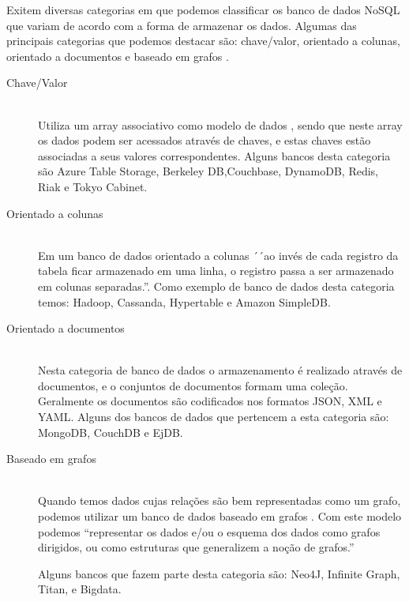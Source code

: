 Exitem diversas categorias\cite{NosqlDatabase} em que podemos classificar os banco de dados NoSQL que variam de acordo com a forma de armazenar os dados. Algumas das  principais categorias que podemos destacar são: chave/valor, orientado a colunas, orientado a documentos e baseado em grafos \cite{AnaliseNosql}.
\begin{description}
\item[Chave/Valor] \hfill \\ 
Utiliza um array associativo como modelo de dados \cite{NosqlWiki}, sendo que neste array os dados podem ser acessados através de chaves, e estas chaves estão associadas a seus valores correspondentes. Alguns bancos desta categoria são Azure Table Storage, Berkeley DB,Couchbase, DynamoDB, Redis, Riak e Tokyo Cabinet.

\item[Orientado a colunas] \hfill \\ 
Em um banco de dados orientado a colunas ´´ao invés de cada registro da tabela ficar armazenado em uma linha, o registro passa a ser armazenado em colunas separadas.''\cite{NosqlCol}. Como exemplo de banco de dados desta categoria temos:  Hadoop, Cassanda, Hypertable e Amazon SimpleDB.

\item[Orientado a documentos] \hfill \\ 
Nesta categoria de banco de dados o armazenamento é realizado através de documentos, e o conjuntos de documentos formam uma coleção. Geralmente os documentos são codificados nos formatos JSON, XML e YAML\cite{NosqlWiki}. Alguns dos bancos de dados que pertencem a esta categoria são: MongoDB, CouchDB e EjDB.


\item[Baseado em grafos] \hfill \\ 
Quando temos dados cujas relações são bem representadas como um grafo, podemos utilizar um banco de dados baseado em grafos \cite{NosqlWiki}. Com este modelo podemos ``representar os dados e/ou o esquema dos dados como grafos dirigidos, ou como estruturas que generalizem a noção de grafos.'' \cite{IntNosql}

Alguns bancos que fazem parte desta categoria são: Neo4J, Infinite Graph, Titan, e Bigdata.

\end{description}


